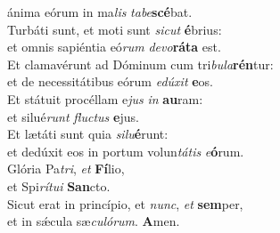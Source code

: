 \evenverse ánima eórum in ma\textit{lis} \textit{ta}\textit{be}\textbf{scé}bat.\\
\oddverse Turbáti sunt, et moti sunt \textit{si}\textit{cut} \textbf{é}brius:~\*\\
\oddverse et omnis sapiéntia eó\textit{rum} \textit{de}\textit{vo}\textbf{rá}\textbf{ta} est.\\
\evenverse Et clamavérunt ad Dóminum cum tri\textit{bu}\textit{la}\textbf{rén}tur:~\*\\
\evenverse et de necessitátibus eórum \textit{e}\textit{dú}\textit{xit} \textbf{e}os.\\
\oddverse Et státuit procéllam e\textit{jus} \textit{in} \textbf{au}ram:~\*\\
\oddverse et silué\textit{runt} \textit{flu}\textit{ctus} \textbf{e}jus.\\
\evenverse Et lætáti sunt quia \textit{si}\textit{lu}\textbf{é}runt:~\*\\
\evenverse et dedúxit eos in portum volun\textit{tá}\textit{tis} \textit{e}\textbf{ó}rum.\\
\oddverse Glória Pa\textit{tri}, \textit{et} \textbf{Fí}lio,~\*\\
\oddverse et Spi\textit{rí}\textit{tu}\textit{i} \textbf{San}cto.\\
\evenverse Sicut erat in princípio, et \textit{nunc}, \textit{et} \textbf{sem}per,~\*\\
\evenverse et in sǽcula sæ\textit{cu}\textit{ló}\textit{rum}. \textbf{A}men.\\
